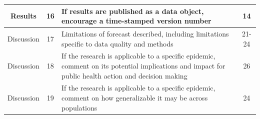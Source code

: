 \documentclass{article}
\begin{document}
\begin{longtable}{c  c  p{6cm}  c}
\midrule
Results & 16 & If results are published as a data object, encourage a time-stamped version number & 14 \\
\midrule
Discussion & 17 & Limitations of forecast described, including limitations specific to data quality and methods & 21-24 \\
\midrule
Discussion & 18 & If the research is applicable to a specific epidemic, comment on its potential implications and impact for public health action and decision making & 26 \\
\midrule
Discussion & 19 & If the research is applicable to a specific epidemic, comment on how generalizable it may be across populations & 24 \\
\bottomrule
\end{longtable}
\end{document}
